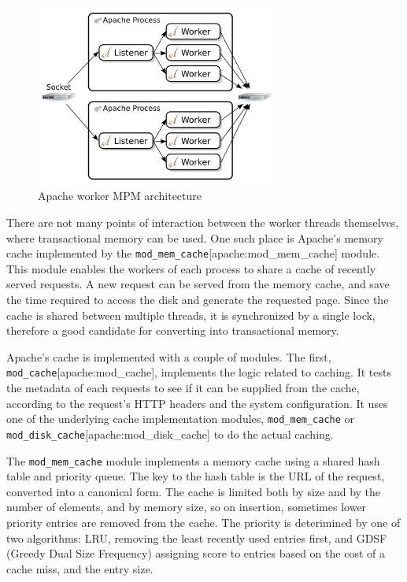 \documentclass[preprint,natbib,11pt]{sigplanconf}
\begin{document}
\begin{figure}
 \begin{center}
  \includegraphics[width=8cm]{Apache-Worker-MPM.png}
 \end{center}
 \caption{Apache worker MPM architecture}
 \label{apache-worker-MPM}
\end{figure}

There are not many points of interaction between the worker threads themselves, where transactional memory can be used. One such place is Apache's memory cache implemented by the {\tt mod\_mem\_cache}[apache:mod\_mem\_cache] module. This module enables the workers of each process to share a cache of recently served requests. A new request can be served from the memory cache, and save the time required to access the disk and generate the requested page. Since the cache is shared between multiple threads, it is synchronized by a single lock, therefore a good candidate for converting into transactional memory.

Apache's cache is implemented with a couple of modules. The first, {\tt mod\_cache}[apache:mod\_cache], implements the logic related to caching. It tests the metadata of each requests to see if it can be supplied from the cache, according to the request's HTTP headers and the system configuration. It uses one of the underlying cache implementation modules, {\tt mod\_mem\_cache} or {\tt mod\_disk\_cache}[apache:mod\_disk\_cache] to do the actual caching.

The {\tt mod\_mem\_cache} module implements a memory cache using a shared hash table and priority queue. The key to the hash table is the URL of the request, converted into a canonical form. The cache is limited both by size and by the number of elements, and by memory size, so on insertion, sometimes lower priority entries are removed from the cache. The priority is deterimined by one of two algorithms: LRU, removing the least recently used entries first, and GDSF (Greedy Dual Size Frequency) assigning score to entries based on the cost of a cache miss, and the entry size.
\end{document}
